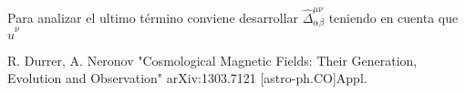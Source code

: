 \documentclass[11pt,a4paper]{article}
\begin{document}
Para analizar el ultimo término conviene desarrollar $\hat{\Delta}^{{\mu}{\nu}}_{{\alpha}{\beta}}$ teniendo en cuenta que $\hat{u}^{\nu}$





\begin{thebibliography}{10}

 R. Durrer, A. Neronov "Cosmological Magnetic Fields: Their Generation, Evolution and Observation" 	arXiv:1303.7121 [astro-ph.CO]Appl. 

\end{thebibliography}
\end{document}
